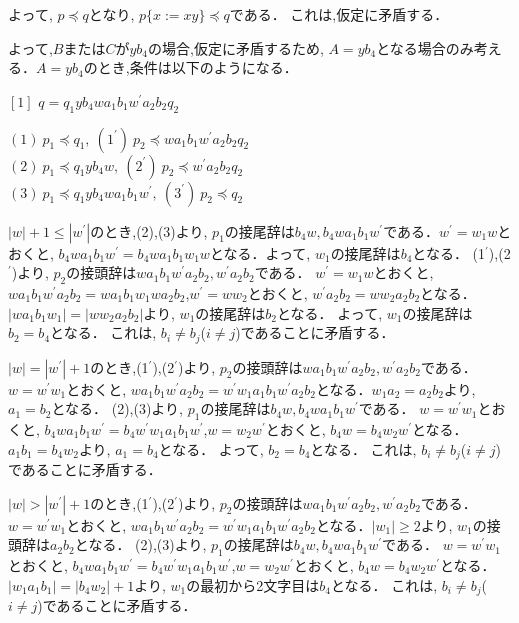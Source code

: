 よって, $p \preceq q$となり, $p \{ x:=xy \} \preceq q$である．
これは,仮定に矛盾する．

よって,$B$または$C$が$yb_{4}$の場合,仮定に矛盾するため, $A=yb_{4}$となる場合のみ考える．$A=yb_{4}$のとき,条件は以下のようになる．
\medskip

\noindent $[1]$ $q=q_{1}yb_{4}wa_{1}b_{1}w^{\prime}a_{2}b_{2}q_{2}$ 
\medskip

\indent$(1) \ p_{1} \preceq q_{1}, \ (1^{\prime}) \ p_{2} \preceq wa_{1}b_{1}w^{\prime}a_{2}b_{2}q_{2}$ \\
\indent $(2) \ p_{1} \preceq q_{1}yb_{4}w, \ (2^{\prime}) \ p_{2} \preceq w^{\prime}a_{2}b_{2}q_{2}$ \\
\indent $(3) \ p_{1} \preceq q_{1}yb_{4}wa_{1}b_{1}w^{\prime}, \ (3^{\prime}) \ p_{2} \preceq q_{2}$ 
\medskip

$|w|+1 \le |w^{\prime}|$のとき,(2),(3)より, $p_{1}$の接尾辞は$b_{4}w, b_{4}wa_{1}b_{1}w^{\prime}$である．$w^{\prime}=w_{1}w$とおくと, $b_{4}wa_{1}b_{1}w^{\prime}=b_{4}wa_{1}b_{1}w_{1}w$となる．よって, $w_{1}$の接尾辞は$b_{4}$となる．
(1$^{\prime}$),(2$^{\prime}$)より, $p_{2}$の接頭辞は$wa_{1}b_{1}w^{\prime}a_{2}b_{2}, w^{\prime}a_{2}b_{2}$である．	
$w^{\prime}=w_{1}w$とおくと, $wa_{1}b_{1}w^{\prime}a_{2}b_{2}=wa_{1}b_{1}w_{1}wa_{2}b_{2}$,$w^{\prime}=ww_{2}$とおくと, $w^{\prime}a_{2}b_{2}=ww_{2}a_{2}b_{2}$となる．
$|wa_{1}b_{1}w_{1}|=|ww_{2}a_{2}b_{2}|$より, $w_{1}$の接尾辞は$b_{2}$となる．
よって, $w_{1}$の接尾辞は$b_{2}=b_{4}$となる．
これは, $b_{i} \ne b_{j}$($i \ne j$)であることに矛盾する．

$|w| = |w^{\prime}|+1$のとき,(1$^{\prime}$),(2$^{\prime}$)より, $p_{2}$の接頭辞は$wa_{1}b_{1}w^{\prime}a_{2}b_{2}, w^{\prime}a_{2}b_{2}$である．
$w=w^{\prime}w_{1}$とおくと, $wa_{1}b_{1}w^{\prime}a_{2}b_{2}=w^{\prime}w_{1}a_{1}b_{1}w^{\prime}a_{2}b_{2}$となる．$w_{1}a_{2}=a_{2}b_{2}$より, $a_{1}=b_{2}$となる．
(2),(3)より, $p_{1}$の接尾辞は$b_{4}w, b_{4}wa_{1}b_{1}w^{\prime}$である．
$w=w^{\prime}w_{1}$とおくと, $b_{4}wa_{1}b_{1}w^{\prime}=b_{4}w^{\prime}w_{1}a_{1}b_{1}w^{\prime}$,$w=w_{2}w^{\prime}$とおくと, $b_{4}w=b_{4}w_{2}w^{\prime}$となる．
$a_{1}b_{1}=b_{4}w_{2}$より, $a_{1}=b_{4}$となる．
よって, $b_{2}=b_{4}$となる．
これは, $b_{i} \ne b_{j}$($i \ne j$)であることに矛盾する．

$|w| > |w^{\prime}|+1$のとき,(1$^{\prime}$),(2$^{\prime}$)より, $p_{2}$の接頭辞は$wa_{1}b_{1}w^{\prime}a_{2}b_{2}, w^{\prime}a_{2}b_{2}$である．
$w=w^{\prime}w_{1}$とおくと, $wa_{1}b_{1}w^{\prime}a_{2}b_{2}=w^{\prime}w_{1}a_{1}b_{1}w^{\prime}a_{2}b_{2}$となる．$|w_{1}| \ge 2$より, $w_{1}$の接頭辞は$a_{2}b_{2}$となる．
(2),(3)より, $p_{1}$の接尾辞は$b_{4}w, b_{4}wa_{1}b_{1}w^{\prime}$である．
$w=w^{\prime}w_{1}$とおくと, $b_{4}wa_{1}b_{1}w^{\prime}=b_{4}w^{\prime}w_{1}a_{1}b_{1}w^{\prime}$,$w=w_{2}w^{\prime}$とおくと, $b_{4}w=b_{4}w_{2}w^{\prime}$となる．
$|w_{1}a_{1}b_{1}|=|b_{4}w_{2}|+1$より, $w_{1}$の最初から2文字目は$b_{4}$となる．
これは, $b_{i} \ne b_{j}$($i \ne j$)であることに矛盾する．
\medskip

